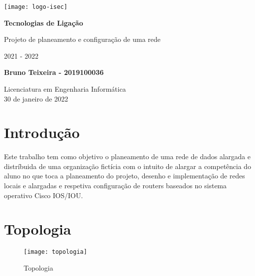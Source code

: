 \documentclass[11pt]{article}
\begin{document}
	\begin{titlepage}
    	\begin{center}
    		\texttt{[image: logo-isec]}
    		
    		\vspace*{\fill}
    		
    		\Huge
    		\textbf{Tecnologias de Ligação}
    		
    		\huge
    		Projeto de planeamento e configuração de uma rede
    		
    		\vspace{0.5cm}
    		\LARGE
    		2021 - 2022
    		
    		\vspace{1.5cm}
    		
    		\textbf{Bruno Teixeira - 2019100036}
    		
    		\vfill
    		\vspace*{\fill}
    		
    		\normalsize
    		Licenciatura em Engenharia Informática \\
    		30 de janeiro de 2022		
    	\end{center}
    \end{titlepage}
	


	\tableofcontents
	\pagebreak
	\listoffigures
	\pagebreak
	
	\large	
	\section{Introdução}
	\normalsize
	\paragraph{}
	Este trabalho tem como objetivo o planeamento de uma rede de dados alargada e distríbuida de uma organização fictícia com o intuito de alargar a competência do aluno no que toca a planeamento do projeto, desenho e implementação de redes locais e alargadas e respetiva configuração de routers baseados no sistema operativo Cisco IOS/IOU.
    
	\large
	\section{Topologia}
	\normalsize
	
	\begin{figure}[h]
		\centering
		\texttt{[image: topologia]}
		\caption{Topologia}
		\label{fig.nav}
	\end{figure}
	
\end{document}
